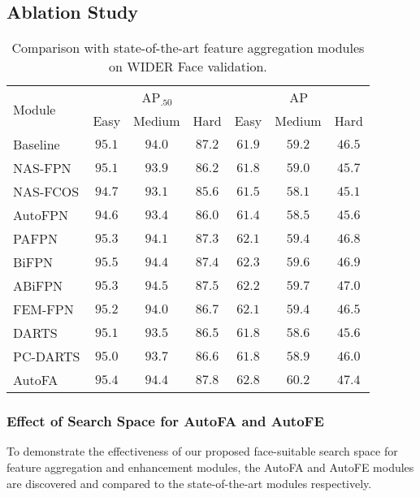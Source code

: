 \documentclass[sigconf]{acmart}
\begin{document}
\subsection{Ablation Study}

\begin{table}[!t]
    \centering
    \begin{tabular}{l|ccc|ccc}
        \toprule[1pt]
        \multirow{2}{*}{Module} & \multicolumn{3}{c|}{AP$_{.50}$} & \multicolumn{3}{c}{AP} \\
        \cline{2-7}
        & Easy & Medium & Hard & Easy & Medium & Hard \\
        \midrule[0.5pt]
        Baseline & $95.1$ & $94.0$ & $87.2$ & $61.9$ & $59.2$ & $46.5$ \\
        NAS-FPN & $95.1$ & $93.9$ & $86.2$ & $61.8$ & $59.0$ & $45.7$ \\
        NAS-FCOS & $94.7$ & $93.1$ & $85.6$ & $61.5$ & $58.1$ & $45.1$ \\
        AutoFPN & $94.6$ & $93.4$ & $86.0$ & $61.4$ & $58.5$ & $45.6$ \\
        PAFPN & $95.3$ & $94.1$ & $87.3$ & $62.1$ & $59.4$ & $46.8$ \\
        BiFPN & $95.5$ & $94.4$ & $87.4$ & $62.3$ & $59.6$ & $46.9$ \\
        ABiFPN & $95.3$ & $94.5$ & $87.5$ & $62.2$ & $59.7$ & $47.0$ \\
        FEM-FPN & $95.2$ & $94.0$ & $86.7$ & $62.1$ & $59.4$ & $46.5$ \\
        DARTS & $95.1$ & $93.5$ & $86.5$ & $61.8$ & $58.6$ & $45.6$ \\
        PC-DARTS & $95.0$ & $93.7$ & $86.6$ & $61.8$ & $58.9$ & $46.0$ \\
        \bottomrule[0.5pt]
        AutoFA & $95.4$ & $94.4$ & $\mathbf{87.8}$ & $\mathbf{62.8}$ & $\mathbf{60.2}$ & $\mathbf{47.4}$\\
        \bottomrule[1pt]
    \end{tabular}
    \caption{Comparison with state-of-the-art feature aggregation modules on WIDER Face validation.}
    \label{tab:autofa}
\end{table}

\subsubsection{Effect of Search Space for AutoFA and AutoFE}
To demonstrate the effectiveness of our proposed face-suitable search space for feature aggregation and enhancement modules, the AutoFA and AutoFE modules are discovered and compared to the state-of-the-art modules respectively.
\end{document}
